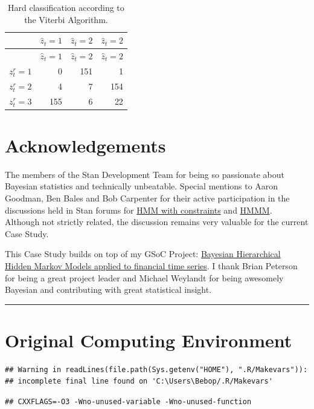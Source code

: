 \documentclass[]{article}
\begin{document}
\begin{longtable}[]{@{}lrrr@{}}
\caption{Hard classification according to the Viterbi
Algorithm.}\tabularnewline
\toprule
& \(\hat{z}_t = 1\) & \(\hat{z}_t = 2\) &
\(\hat{z}_t = 2\)\tabularnewline
\midrule
\endfirsthead
\toprule
& \(\hat{z}_t = 1\) & \(\hat{z}_t = 2\) &
\(\hat{z}_t = 2\)\tabularnewline
\midrule
\endhead
\(z^r_t = 1\) & 0 & 151 & 1\tabularnewline
\(z^r_t = 2\) & 4 & 7 & 154\tabularnewline
\(z^r_t = 3\) & 155 & 6 & 22\tabularnewline
\bottomrule
\end{longtable}

\section{Acknowledgements}\label{acknowledgements}

The members of the Stan Development Team for being so passionate about
Bayesian statistics and technically unbeatable. Special mentions to
Aaron Goodman, Ben Bales and Bob Carpenter for their active
participation in the discussions held in Stan forums for
\href{http://discourse.mc-stan.org/t/hidden-markov-model-with-constraints/1625/4}{HMM
with constraints} and
\href{http://discourse.mc-stan.org/t/transversing-up-a-graph-hierarchical-hidden-markov-model/1304/11}{HMMM}.
Although not strictly related, the discussion remains very valuable for
the current Case Study.

This Case Study builds on top of my GSoC Project:
\href{https://github.com/luisdamiano/gsoc17-hhmm}{Bayesian Hierarchical
Hidden Markov Models applied to financial time series}. I thank Brian
Peterson for being a great project leader and Michael Weylandt for being
awesomely Bayesian and contributing with great statistical insight.

\begin{center}\rule{0.5\linewidth}{\linethickness}\end{center}

\section{Original Computing
Environment}\label{original-computing-environment}

\begin{verbatim}
## Warning in readLines(file.path(Sys.getenv("HOME"), ".R/Makevars")):
## incomplete final line found on 'C:\Users\Bebop/.R/Makevars'
\end{verbatim}

\begin{verbatim}
## CXXFLAGS=-O3 -Wno-unused-variable -Wno-unused-function
\end{verbatim}
\end{document}
